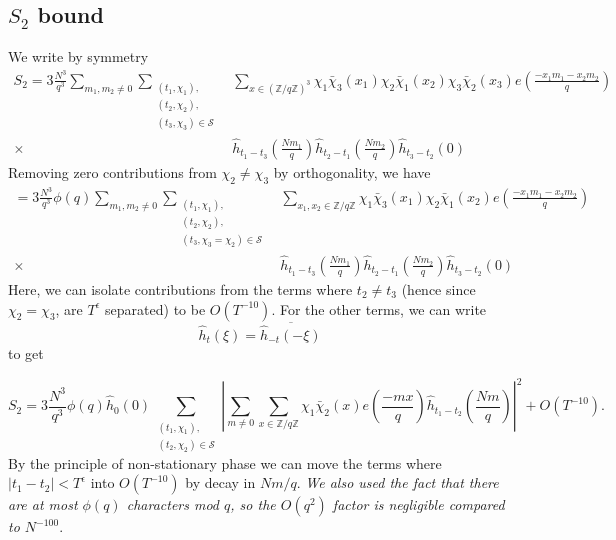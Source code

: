 \subsection{$S_2$ bound}
We write by symmetry \begin{align*}
    S_2= 3\frac{N^3}{q^3}\sum_{m_1,m_2\neq 0}\sum_{\substack{(t_1,\chi_1),\\(t_2,\chi_2),\\(t_3,\chi_3)\in\mathcal{S}}} &\sum_{x\in (\mathbb{Z}/q\mathbb{Z})^3}\chi_1\bar{\chi}_3(x_1)\chi_2\bar{\chi}_1(x_2)\chi_3\bar{\chi}_2(x_3) e\left(\frac{-x_1m_1-x_2m_2}{q}\right)\\
    \times \ &\hat{h}_{t_1-t_3}\left(\frac{Nm_1}{q}\right)\hat{h}_{t_2-t_1}\left(\frac{Nm_2}{q}\right)\hat{h}_{t_3-t_2}\left(0\right)
\end{align*}
Removing zero contributions from $\chi_2\neq \chi_3$ by orthogonality,
we have \begin{align*}
    =3\frac{N^3}{q^3} \phi(q) \sum_{m_1,m_2\neq 0}\sum_{\substack{(t_1,\chi_1),\\(t_2,\chi_2),\\(t_3,\chi_3=\chi_2)\in\mathcal{S}}} &\sum_{x_1,x_2 \in \mathbb{Z}/q\mathbb{Z}}\chi_1\bar{\chi}_3(x_1)\chi_2\bar{\chi}_1(x_2) e\left(\frac{-x_1m_1-x_2m_2}{q}\right)\\
    \times \ &\hat{h}_{t_1-t_3}\left(\frac{Nm_1}{q}\right)\hat{h}_{t_2-t_1}\left(\frac{Nm_2}{q}\right)\hat{h}_{t_3-t_2}\left(0\right)
\end{align*}
Here, we can isolate contributions from the terms where $t_2\neq t_3$ (hence since $\chi_2=\chi_3$, are $T^{\epsilon}$ separated) to be $O(T^{-10})$. For the other terms, we can write
\[
    \hat{h}_t(\xi) = \overline{\hat{h}_{-t}(-\xi)}
\]
to get 
\iffalse
$S_2$
\begin{align*}
    = 3\frac{N^3}{q^3} \hat{h}_{0}\left(0\right)\phi(q) \sum_{m_1,m_2\neq 0}\sum_{\substack{(t_1,\chi_1),\\(t_2,\chi_2)\in\mathcal{S}}} &\sum_{x_1,x_2 \in \mathbb{Z}/q\mathbb{Z}}\chi_1\bar{\chi}_2(x_1)\chi_2\bar{\chi}_1(x_2) e\left(\frac{-x_1m_1-x_2m_2}{q}\right)\\
    \times \ &\hat{h}_{t_1-t_2}\left(\frac{Nm_1}{q}\right)\hat{h}_{t_2-t_1}\left(\frac{Nm_2}{q}\right)
\end{align*}
and by 

we can rewrite this to get
\fi
\[
    S_2 = 3\frac{N^3}{q^3} \phi(q) \hat{h}_{0}\left(0\right) \sum_{\substack{(t_1,\chi_1),\\(t_2,\chi_2)\in\mathcal{S}}} \left|\sum_{m\neq 0} \sum_{x \in \mathbb{Z}/q\mathbb{Z}}\chi_1\bar{\chi}_2(x) e\left(\frac{-mx}{q}\right)
     \hat{h}_{t_1-t_2}\left(\frac{Nm}{q}\right)\right|^2 + O(T^{-10}).
\]
By the principle of non-stationary phase we can move the terms where $|t_1-t_2|<T^\epsilon$ into $O(T^{-10})$ by decay in $Nm/q$. \textit{We also used the fact that there are at most $\phi(q)$ characters mod $q$, so the $O(q^2)$ factor is negligible compared to $N^{-100}$}.

